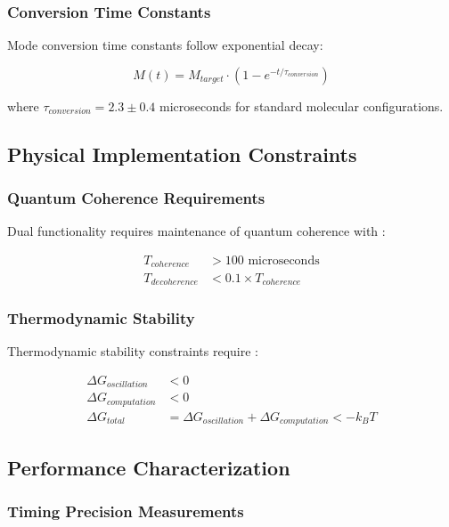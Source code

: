 \documentclass[12pt,a4paper]{article}
\begin{document}
\subsubsection{Conversion Time Constants}

Mode conversion time constants follow exponential decay:

\begin{equation}
M(t) = M_{target} \cdot (1 - e^{-t/\tau_{conversion}})
\end{equation}

where $\tau_{conversion} = 2.3 \pm 0.4$ microseconds for standard molecular configurations.

\subsection{Physical Implementation Constraints}

\subsubsection{Quantum Coherence Requirements}

Dual functionality requires maintenance of quantum coherence with \cite{nielsen2010quantum}:

\begin{align}
T_{coherence} &> 100 \text{ microseconds} \\
T_{decoherence} &< 0.1 \times T_{coherence}
\end{align}

\subsubsection{Thermodynamic Stability}

Thermodynamic stability constraints require \cite{atkins2010physical}:

\begin{align}
\Delta G_{oscillation} &< 0 \\
\Delta G_{computation} &< 0 \\
\Delta G_{total} &= \Delta G_{oscillation} + \Delta G_{computation} < -k_B T
\end{align}

\subsection{Performance Characterization}

\subsubsection{Timing Precision Measurements}
\end{document}
